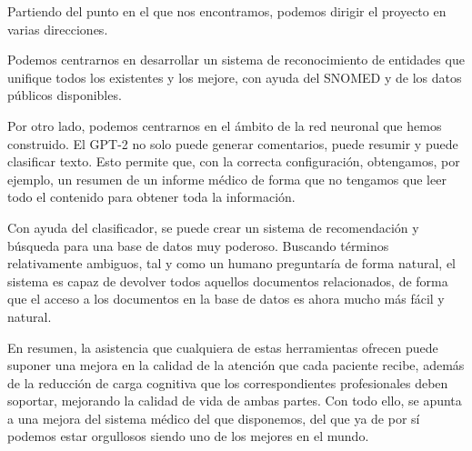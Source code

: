 Partiendo del punto en el que nos encontramos, podemos dirigir el proyecto en varias direcciones.

Podemos centrarnos en desarrollar un sistema de reconocimiento de entidades que unifique todos los existentes y los mejore, con ayuda del SNOMED y de los datos públicos disponibles.

Por otro lado, podemos centrarnos en el ámbito de la red neuronal que hemos construido. El GPT-2 no solo puede generar comentarios, puede resumir y puede clasificar texto. Esto permite que, con la correcta configuración, obtengamos, por ejemplo, un resumen de un informe médico de forma que no tengamos que leer todo el contenido para obtener toda la información.

Con ayuda del clasificador, se puede crear un sistema de recomendación y búsqueda para una base de datos muy poderoso. Buscando términos relativamente ambiguos, tal y como un humano preguntaría de forma natural, el sistema es capaz de devolver todos aquellos documentos relacionados, de forma que el acceso a los documentos en la base de datos es ahora mucho más fácil y natural.

En resumen, la asistencia que cualquiera de estas herramientas ofrecen puede suponer una mejora en la calidad de la atención que cada paciente recibe, además de la reducción de carga cognitiva que los correspondientes profesionales deben soportar, mejorando la calidad de vida de ambas partes. Con todo ello, se apunta a una mejora del sistema médico del que disponemos, del que ya de por sí podemos estar orgullosos siendo uno de los mejores en el mundo.







